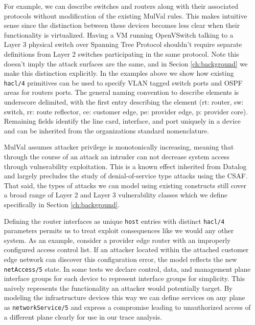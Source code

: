 
For example, we can describe switches and routers along with their associated protocols without modification of the existing MulVal rules. This makes intuitive sense since the distinction between these devices becomes less clear when their functionality is virtualized. Having a VM running OpenVSwitch talking to a Layer 3 physical switch over Spanning Tree Protocol shouldn't require separate definitions from Layer 2 switches participating in the same protocol. Note this doesn't imply the attack surfaces are the same, and in Secion \ref{ch:background} we make this distinction explicitly. In the examples above we show how existing \verb|hacl/4| primitives can be used to specify VLAN tagged switch ports and OSPF areas for routers ports. The general naming convention to describe elements is underscore delimited, with the first entry describing the element (rt: router, sw: switch, rr: route reflector, ce: customer edge, pe: provider edge, p: provider core). Remaining fields identify the line card, interface, and port uniquely in a device and can be inherited from the organizations standard nomenclature. 

MulVal assumes attacker privilege is monotonically increasing, meaning that through the course of an attack an intruder can not decrease system access through vulnerability exploitation. This is a known\cite[Ch 2.6]{Ou_Appel_2005} effect inherited from Datalog and largely precludes the study of denial-of-service type attacks using the CSAF. That said, the types of attacks we can model using existing constructs still cover a broad range of Layer 2 and Layer 3 vulnerability classes which we define specifically in Section \ref{ch:background}.  


Defining the router interfaces as unique \verb|host| entries with distinct \verb|hacl/4| parameters permits us to treat exploit consequences like we would any other system. As an example, consider a provider edge router with an improperly configured access control list. If an attacker located within the attached customer edge network can discover this configuration error, the model reflects the new \verb|netAccess/5| state. In some tests we declare control, data, and management plane interface groups for each device to represent interface groups for simplicity. This naively represents the functionality an attacker would potentially target. By modeling the infrastructure devices this way we can define services on any plane as \verb|networkService/5| and express a compromise leading to unauthorized access of a different plane clearly for use in our trace analysis. 

